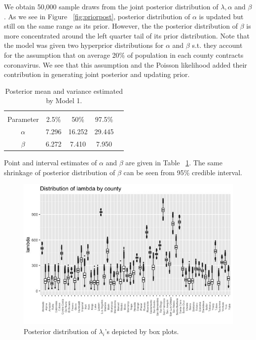 \documentclass[11pt,twocolumn]{asaproc}
\begin{document}
We obtain 50,000 sample draws from the joint posterior distribution of $\lambda, \alpha$ and $\beta$. As we see in Figure ~\ref{fig:priorpost}, posterior distribution of $\alpha$ is updated but still on the same range as its prior. However, the the posterior distribution of $\beta$ is more concentrated around the left quarter tail of its prior distribution. Note that the model was given two hyperprior distributions for $\alpha$ and $\beta$ s.t. they account for the assumption that on average 20\% of population in each county contracts coronavirus. We see that this assumption and the Poisson likelihood added their contribution in generating joint posterior and updating prior. 

\begin{table}
\label{table:fmodelest}
\caption{Posterior mean and variance estimated by Model 1.}
\begin{center}
\begin{tabular}{ccccc}
\hline
\hline
\\[-5pt]
\multicolumn{1}{c}{Parameter} &
\multicolumn{1}{c}{2.5\%} &
\multicolumn{1}{c}{50\%} &
\multicolumn{1}{c}{97.5\%}\\
\hline
$\alpha$&     7.296&	16.252&  29.445\\
$\beta$&     6.272&    7.410&  7.950\\
\hline
\end{tabular}
\end{center}
\end{table}

Point and interval estimates of $\alpha$ and $\beta$ are given in Table ~\ref{table:fmodelest}. The same shrinkage of posterior distribution of $\beta$ can be seen from 95\% credible interval.

\begin{figure}[t]
\centering\includegraphics[scale=.31]{lambdas.jpeg}
\caption{Posterior distribution of $\lambda_i$'s depicted by box plots.}
\label{fig:lambdas}
\end{figure}
\end{document}
